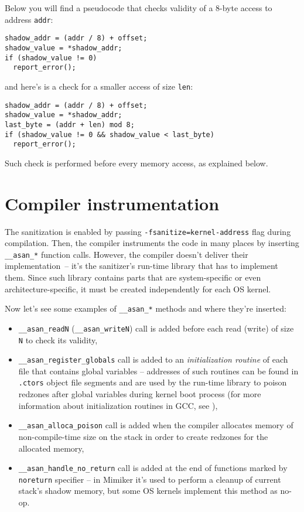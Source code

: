 \documentclass[shortabstract, manyadvisors, english, mgr]{iithesis}
\theoremstyle{definition} \newtheorem*{definition}{Definicja}
\theoremstyle{definition} \newtheorem*{example}{Przykład}
\theoremstyle{definition} \newtheorem*{remark}{Uwaga}
\begin{document}
Below you will find a pseudocode that checks validity of a 8-byte access to address \texttt{addr}:
\begin{lstlisting}
shadow_addr = (addr / 8) + offset;
shadow_value = *shadow_addr;
if (shadow_value != 0)
  report_error();
\end{lstlisting}
and here's is a check for a smaller access of size \texttt{len}:
\begin{lstlisting}
shadow_addr = (addr / 8) + offset;
shadow_value = *shadow_addr;
last_byte = (addr + len) mod 8;
if (shadow_value != 0 && shadow_value < last_byte)
  report_error();
\end{lstlisting}

Such check is performed before every memory access, as explained below.

\section{Compiler instrumentation}
The sanitization is enabled by passing \texttt{-fsanitize=kernel-address} flag during compilation. Then, the compiler instruments the code in many places by inserting \texttt{\_\_asan\_*} function calls. However, the compiler doesn't deliver their implementation~-- it's the sanitizer's run-time library that has to implement them. Since such library contains parts that are system-specific or even architecture-specific, it must be created independently for each OS kernel.

Now let's see some examples of \texttt{\_\_asan\_*} methods and where they're inserted:
\begin{itemize}
    \item \texttt{\_\_asan\_readN} (\texttt{\_\_asan\_writeN}) call is added before each read (write) of size \texttt{N} to check its validity,
    \item \texttt{\_\_asan\_register\_globals} call is added to an \textit{initialization routine} of each file that contains global variables -- addresses of such routines can be found in \texttt{.ctors} object file segments and are used by the run-time library to poison redzones after global variables during kernel boot process (for more information about initialization routines in GCC, see \cite{bib:gcc-initialization}),
    \item \texttt{\_\_asan\_alloca\_poison} call is added when the compiler allocates memory of non-compile-time size on the stack in order to create redzones for the allocated memory,
    \item \texttt{\_\_asan\_handle\_no\_return} call is added at the end of functions marked by \texttt{noreturn} specifier -- in Mimiker it's used to perform a cleanup of current stack's shadow memory, but some OS kernels implement this method as no-op.
\end{itemize}
\end{document}
